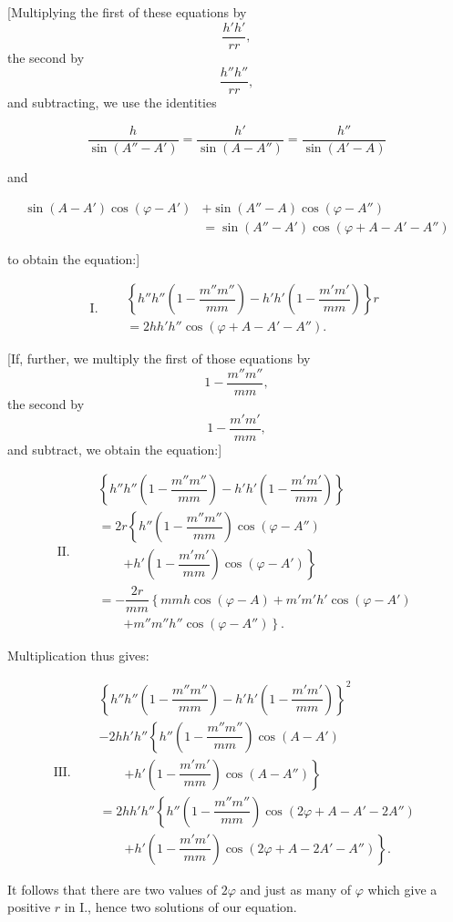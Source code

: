 
[Multiplying the first of these equations by
\[
\dfrac{h'h'}{rr},
\]
the second by
\[
\dfrac{h''h''}{rr},
\]
and subtracting, we use the identities

\[
\dfrac{h}{\sin(A''-A')} = \dfrac{h'}{\sin(A-A'')} = \dfrac{h''}{\sin(A'-A)}
\]

and

\[
\begin{aligned}\sin(A-A')\cos(\varphi-A') &+ \sin(A''-A)\cos(\varphi-A'')\\ &= \sin(A''-A')\cos(\varphi+A-A'-A'')\end{aligned}
\]

to obtain the equation:]

\[
\mathrm{I.}\quad \begin{aligned}&\left\{h''h''\left(1-\dfrac{m''m''}{mm}\right) - h'h'\left(1-\dfrac{m'm'}{mm}\right)\right\}r \\
&= 2hh'h''\cos(\varphi+A-A'-A'').\end{aligned}
\]

[If, further, we multiply the first of those equations by
\[
1 - \dfrac{m''m''}{mm},
\]
the second by
\[
1 - \dfrac{m'm'}{mm},
\]
and subtract, we obtain the equation:]

\[
\mathrm{II.}\quad 
\begin{aligned}
&\left\{h''h''\left(1-\dfrac{m''m''}{mm}\right) - h'h'\left(1-\dfrac{m'm'}{mm}\right)\right\} \\
&= 2r\left\{h''\left(1-\dfrac{m''m''}{mm}\right)\cos(\varphi-A'')\right.\\ &\qquad\left. + h'\left(1-\dfrac{m'm'}{mm}\right)\cos(\varphi-A')\right\}\\
&= -\dfrac{2r}{mm}\left\{mmh\cos(\varphi-A) + m'm'h'\cos(\varphi-A')\right.\\ &\qquad\left. + m''m''h''\cos(\varphi-A'')\right\}.
\end{aligned}
\]

Multiplication thus gives:

\[
\mathrm{III.}\quad 
\begin{aligned}
&\left\{h''h''\left(1-\dfrac{m''m''}{mm}\right) - h'h'\left(1-\dfrac{m'm'}{mm}\right)\right\}^2 \\
&- 2hh'h''\left\{h''\left(1-\dfrac{m''m''}{mm}\right)\cos(A-A')\right.\\ &\qquad\left. + h'\left(1-\dfrac{m'm'}{mm}\right)\cos(A-A'')\right\}\\
&= 2hh'h''\left\{h''\left(1-\dfrac{m''m''}{mm}\right)\cos(2\varphi+A-A'-2A'')\right.\\ &\qquad\left. + h'\left(1-\dfrac{m'm'}{mm}\right)\cos(2\varphi+A-2A'-A'')\right\}.
\end{aligned}
\]

It follows that there are two values of $2\varphi$ and just as many of $\varphi$ which give a positive $r$ in I., hence two solutions of our equation.
